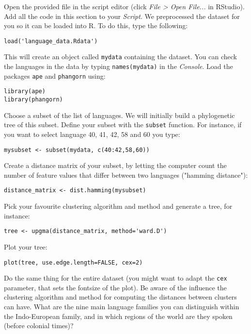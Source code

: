 \documentclass[a4paper, 9pt]{article}
\begin{document}
\begin{exercise}
\action Open the provided  file in the script editor (click \emph{File > Open File...} in RStudio). Add all the code in this section to your \emph{Script}.
\action We preprocessed the dataset for you so it can be loaded into R. To do this, type the following: 
\begin{lstlisting}
load('language_data.Rdata')
\end{lstlisting}
This will create an object called \verb|mydata| containing the dataset.
You can check the languages in the data by typing \verb|names(mydata)| in the \emph{Console}.
\action Load the packages \verb|ape| and \verb|phangorn| using:
\begin{lstlisting}
library(ape)
library(phangorn)
\end{lstlisting}
\action Choose a subset of the list of languages. We will initially build a phylogenetic tree of this subset. Define your subset with the \verb|subset| function. For instance, if you want to select language 40, 41, 42, 58 and 60 you type:
\begin{lstlisting}
mysubset <- subset(mydata, c(40:42,58,60))
\end{lstlisting}
\action Create a distance matrix of your subset, by letting the computer count the number of feature values that differ between two languages ("hamming distance"):\begin{lstlisting}
distance_matrix <- dist.hamming(mysubset)
\end{lstlisting}
\action Pick your favourite clustering algorithm and method and generate a tree, for instance:\begin{lstlisting}
tree <- upgma(distance_matrix, method='ward.D')
\end{lstlisting}
\action Plot your tree:\begin{lstlisting}
plot(tree, use.edge.length=FALSE, cex=2)
\end{lstlisting}
\action Do the same thing for the entire dataset (you might want to adapt the \verb|cex| parameter, that sets the fontsize of the plot). Be aware of the influence the clustering algorithm and method for computing the distances between clusters can have.
\askstar What are the nine main language families you can distinguish within the Indo-European family, and in which regions of the world are they spoken (before colonial times)?
\end{exercise}

\printbibliography
\end{document}

